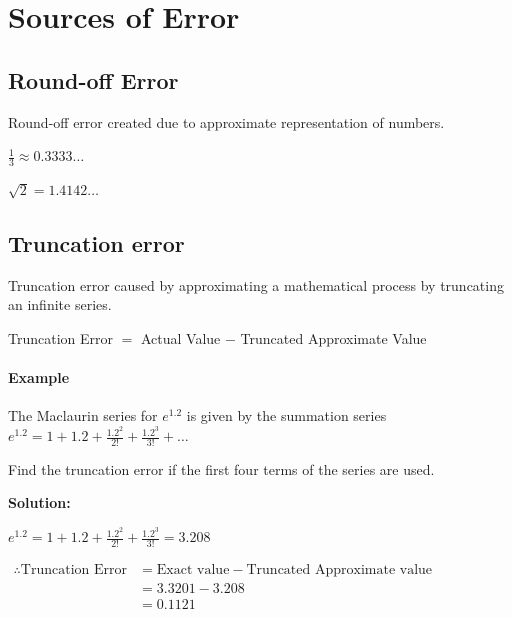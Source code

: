 \chapter{Sources of Error}

\section{Round-off Error}
Round-off error created due to approximate representation of numbers.

\begin{center}
   $\frac{\text{1}}{\text{3}} \approx \text{0.3333} \ldots$

   $\sqrt{2} = 1.4142 \ldots$
\end{center}


\section{Truncation error}
Truncation error caused by approximating a mathematical process by truncating an infinite series.

\begin{center}
   Truncation Error $=$ Actual Value $-$ Truncated Approximate Value
\end{center}


\subsubsection{Example}
The Maclaurin series for $e^{1.2}$ is given by the summation series
\quad $e^{1.2}=1+1.2+\frac{1.2^2}{2!}+\frac{1.2^3}{3!}+\ldots$

Find the truncation error if the first four terms of the series are used.

\textbf{Solution:}

$e^{1.2} = 1+1.2+\frac{1.2^2}{2!}+\frac{1.2^3}{3!} = 3.208$

$\begin{aligned}
   \therefore \text{Truncation Error} &= \text{Exact value} - \text{Truncated Approximate value} \\
   &= 3.3201 - 3.208 \\
   &= 0.1121
\end{aligned}$